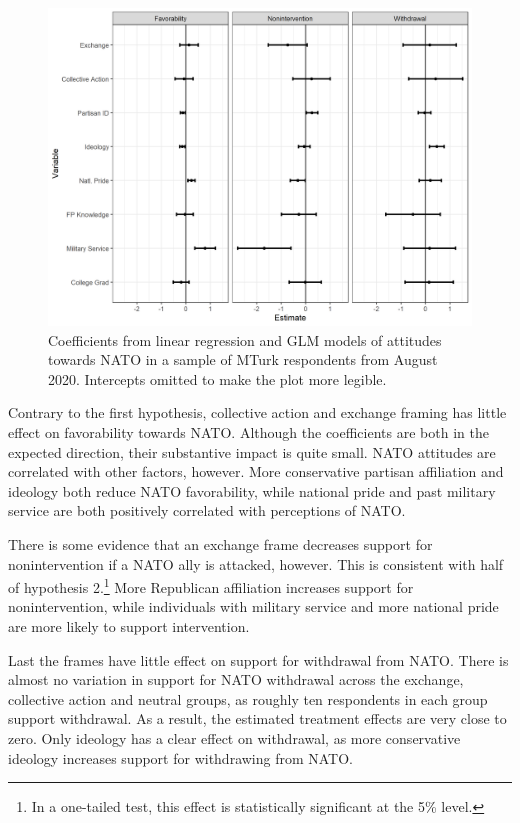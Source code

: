 \documentclass[12pt]{article}
\begin{document}
\begin{figure}
\includegraphics[width = .95\textwidth]{../figures/mturk-res-both.png} 
\caption{Coefficients from linear regression and GLM models of attitudes towards NATO in a sample of MTurk respondents from August 2020. Intercepts omitted to make the plot more legible.}
\label{fig:mturk-res-both} 
\end{figure} 


Contrary to the first hypothesis, collective action and exchange framing has  little effect on favorability towards NATO. 
Although the coefficients are both in the expected direction, their substantive impact is quite small. 
NATO attitudes are correlated with other factors, however. 
More conservative partisan affiliation and ideology both reduce NATO favorability, while national pride and past military service are both positively correlated with perceptions of NATO. 


There is some evidence that an exchange frame decreases support for nonintervention if a NATO ally is attacked, however. 
This is consistent with half of hypothesis 2.\footnote{In a one-tailed test, this effect is statistically significant at the 5\% level.}
More Republican affiliation increases support for nonintervention, while individuals with military service and more national pride are more likely to support intervention.  


Last the frames have little effect on support for withdrawal from NATO. 
There is almost no variation in support for NATO withdrawal across the exchange, collective action and neutral groups, as roughly ten respondents in each group support withdrawal.  
As a result, the estimated treatment effects are very close to zero. 
Only ideology has a clear effect on withdrawal, as more conservative ideology increases support for withdrawing from NATO. 
\end{document}
